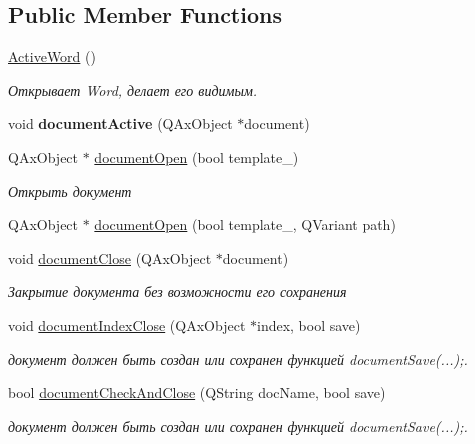 \subsection*{Public Member Functions}
\begin{DoxyCompactItemize}
\item 
\mbox{\label{class_active_word_ae188e2bf603d03d6cd2cbb284749da2a}} 
\hyperlink{class_active_word_ae188e2bf603d03d6cd2cbb284749da2a}{Active\+Word} ()
\begin{DoxyCompactList}\small\item\em Открывает Word, делает его видимым. \end{DoxyCompactList}\item 
\mbox{\label{class_active_word_aa521363ea4cf23effb20e9cd067fa519}} 
void {\bfseries document\+Active} (Q\+Ax\+Object $\ast$document)
\item 
Q\+Ax\+Object $\ast$ \hyperlink{class_active_word_ac476c967a4aa37247c8f67c3de718ecb}{document\+Open} (bool template\+\_\+)
\begin{DoxyCompactList}\small\item\em Открыть документ \end{DoxyCompactList}\item 
Q\+Ax\+Object $\ast$ \hyperlink{class_active_word_a86aa910fb6bfd796b4198600207ddca1}{document\+Open} (bool template\+\_\+, Q\+Variant path)
\item 
void \hyperlink{class_active_word_a496e3f8347f6709f0ff529966c97d082}{document\+Close} (Q\+Ax\+Object $\ast$document)
\begin{DoxyCompactList}\small\item\em Закрытие документа без возможности его сохранения \end{DoxyCompactList}\item 
void \hyperlink{class_active_word_a32aea81a77cbeb1128fc748d7ab2b86a}{document\+Index\+Close} (Q\+Ax\+Object $\ast$index, bool save)
\begin{DoxyCompactList}\small\item\em документ должен быть создан или сохранен функцией document\+Save(...);. \end{DoxyCompactList}\item 
bool \hyperlink{class_active_word_aa891183cf73a7b63a60e9d9c8674c360}{document\+Check\+And\+Close} (Q\+String doc\+Name, bool save)
\begin{DoxyCompactList}\small\item\em документ должен быть создан или сохранен функцией document\+Save(...);. \end{DoxyCompactList}\item 

\end{DoxyCompactItemize}
